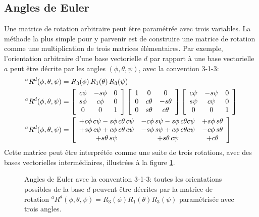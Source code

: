 \subsection{Angles de Euler}
\label{sec:angeuler}

Une matrice de rotation arbitraire peut être paramétrée avec trois variables. La méthode la plus simple pour y parvenir est de construire une matrice de rotation comme une multiplication de trois matrices élémentaires. Par exemple, l'orientation arbitraire d'une base vectorielle $d$ par rapport à une base vectorielle $a$ peut être décrite par les angles $( \phi, \theta, \psi)$, avec la convention 3-1-3:
\begin{align}
{}^aR^d(\phi,\theta,\psi) &= R_3(\phi) \, R_1(\theta) \, R_3(\psi) \\
{}^aR^d(\phi,\theta,\psi) &= 
\left[ \begin{array}{c c c}
	c\phi & -s\phi & 0 \\
	s\phi & c\phi & 0 \\
	0 & 0 & 1 
\end{array}  \right]
\left[ \begin{array}{c c c}
	1 & 0 & 0 \\
	0 & c\theta  & -s\theta \\
	0 & s\theta & c\theta 
\end{array}  \right]
\left[ \begin{array}{c c c}
	c\psi & -s\psi & 0 \\
	s\psi & c\psi & 0 \\
	0 & 0 & 1 
\end{array}  \right] \\
{}^aR^d(\phi,\theta,\psi) &= 
\left[ \begin{array}{c c c}
	 + c\phi \, c\psi - s\phi\,c\theta\,c\psi  & - c\phi \, s\psi - s\phi \, c\theta c\psi  & + s\phi \, s\theta  \\
	 + s\phi \, c\psi + c\phi\,c\theta\,c\psi  & - s\phi \, s\psi + c\phi \, c\theta c\psi  & - c\phi \, s\theta  \\
	 + s\theta \, s\psi                        & + s\theta \, c\psi                          & + c\theta 
\end{array}  \right]
\end{align} 
Cette matrice peut être interprétée comme une suite de trois rotations, avec des bases vectorielles intermédiaires, illustrées à la figure \ref{fig:euler}. 
\begin{figure}[H]
        \centering
        \caption{Angles de Euler avec la convention 3-1-3: toutes les orientations possibles de la base $d$ peuvent être décrites par la matrice de rotation ${}^aR^d(\phi,\theta,\psi) = R_3(\phi)R_1(\theta)R_3(\psi)$ paramétrisée avec trois angles.}
				\label{fig:euler}
\end{figure}
